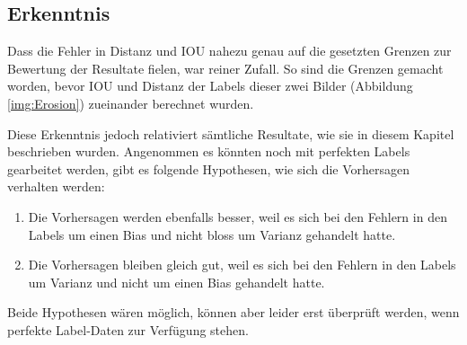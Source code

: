 \subsection{Erkenntnis}
Dass die Fehler in Distanz und IOU nahezu genau auf die gesetzten Grenzen zur Bewertung der Resultate fielen, war reiner Zufall.
So sind die Grenzen gemacht worden, bevor IOU und Distanz der Labels dieser zwei Bilder (Abbildung \ref{img:Erosion}) zueinander berechnet wurden.

Diese Erkenntnis jedoch relativiert sämtliche Resultate, wie sie in diesem Kapitel beschrieben wurden.
Angenommen es könnten noch mit perfekten Labels gearbeitet werden, gibt es folgende Hypothesen, wie sich die Vorhersagen verhalten werden:
\begin{enumerate}
\item Die Vorhersagen werden ebenfalls besser, weil es sich bei den Fehlern in den Labels um einen Bias und nicht bloss um Varianz gehandelt hatte.
\item Die Vorhersagen bleiben gleich gut, weil es sich bei den Fehlern in den Labels um Varianz und nicht um einen Bias gehandelt hatte.
\end{enumerate}
Beide Hypothesen wären möglich, können aber leider erst überprüft werden, wenn \grqq{}perfekte\grqq{} Label-Daten zur Verfügung stehen. 



